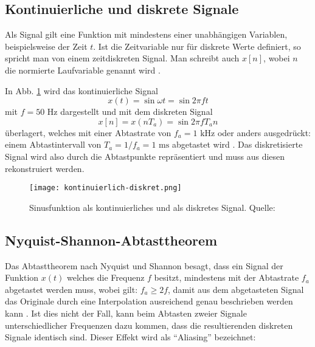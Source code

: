 \subsection{Kontinuierliche und diskrete Signale}
Als Signal gilt eine Funktion mit mindestens einer unabhängigen Variablen, beispielsweise der Zeit \(t\). Ist die Zeitvariable nur für diskrete Werte definiert, so spricht man von einem zeitdiskreten Signal. Man schreibt auch \(x[n]\), wobei \(n\) die normierte Laufvariable genannt wird \cite[vgl. Werner, S. 24]{Werner:2017}.

In Abb. \ref{kontinuierlich_diskret} wird das kontinuierliche Signal
\[x(t) = \sin \omega t = \sin 2\pi f t\]
mit \(f = 50 \text{ Hz} \) dargestellt und mit dem diskreten Signal
\[x[n] = x(nT_a) = \sin 2\pi f T_a n\]
überlagert, welches mit einer Abtastrate von \(f_a = 1 \text{ kHz}\) oder anders ausgedrückt: einem Abtastintervall von \(T_a = 1 / f_a = 1 \text{ ms}\) abgetastet wird \cite[vgl. Heuberger, e. a., S. 11f]{Heuberger:2017}. Das diskretisierte Signal wird also durch die Abtastpunkte repräsentiert und muss aus diesen rekonstruiert werden.

\begin{figure}[ht]
	\centering
	\texttt{[image: kontinuierlich-diskret.png]}
	\caption[Sinusfunktion als kontinuierliches und als diskretes Signal]{Sinusfunktion als kontinuierliches und als diskretes Signal. \newline Quelle: \cite[Heuberger, e. a., S. 12]{Heuberger:2017}} 
	\label{kontinuierlich_diskret}
\end{figure}




\subsection{Nyquist-Shannon-Abtasttheorem}
Das Abtasttheorem nach Nyquist und Shannon besagt, dass ein Signal der Funktion \(x(t)\) welches die Frequenz \(f\) besitzt, mindestens mit der Abtastrate \(f_a\) abgetastet werden muss, wobei gilt: \(f_a \ge 2f\), damit aus dem abgetasteten Signal das Originale durch eine Interpolation ausreichend genau beschrieben werden kann \cite[vgl. Werner, S. 30]{Werner:2006}. 
Ist dies nicht der Fall, kann beim Abtasten zweier Signale unterschiedlicher Frequenzen dazu kommen, dass die resultierenden diskreten Signale identisch sind. Dieser Effekt wird als \enquote{Aliasing} bezeichnet:

